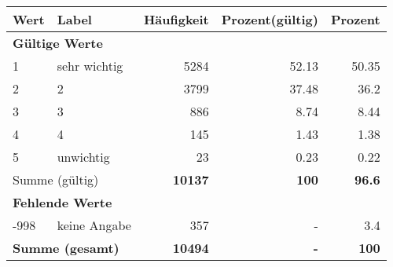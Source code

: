      \begin{longtable}{lXrrr}
     \toprule
     \textbf{Wert} & \textbf{Label} & \textbf{Häufigkeit} & \textbf{Prozent(gültig)} & \textbf{Prozent} \\
     \endhead
     \midrule
     \multicolumn{5}{l}{\textbf{Gültige Werte}}\\

     1 &
     \multicolumn{1}{X}{ sehr wichtig   } &


       \num{5284} &
       \num[round-mode=places,round-precision=2]{52.13} &
         \num[round-mode=places,round-precision=2]{50.35} \\

     2 &
     \multicolumn{1}{X}{ 2   } &


       \num{3799} &
       \num[round-mode=places,round-precision=2]{37.48} &
         \num[round-mode=places,round-precision=2]{36.2} \\

     3 &
     \multicolumn{1}{X}{ 3   } &


       \num{886} &
       \num[round-mode=places,round-precision=2]{8.74} &
         \num[round-mode=places,round-precision=2]{8.44} \\

     4 &
     \multicolumn{1}{X}{ 4   } &


       \num{145} &
       \num[round-mode=places,round-precision=2]{1.43} &
         \num[round-mode=places,round-precision=2]{1.38} \\

     5 &
     \multicolumn{1}{X}{ unwichtig   } &


       \num{23} &
       \num[round-mode=places,round-precision=2]{0.23} &
         \num[round-mode=places,round-precision=2]{0.22} \\
     \midrule
     \multicolumn{2}{l}{Summe (gültig)} &
       \textbf{\num{10137}} &
     \textbf{\num{100}} &
       \textbf{\num[round-mode=places,round-precision=2]{96.6}} \\
     \multicolumn{5}{l}{\textbf{Fehlende Werte}}\\
       -998 &
       keine Angabe &
         \num{357} &
        - &
         \num[round-mode=places,round-precision=2]{3.4} \\
     \midrule
     \multicolumn{2}{l}{\textbf{Summe (gesamt)}} &
          \textbf{\num{10494}} &
        \textbf{-} &
        \textbf{\num{100}} \\
     \bottomrule
     \end{longtable}
     
